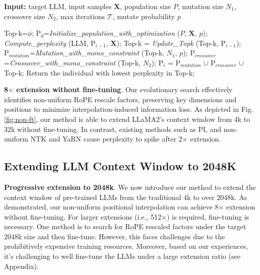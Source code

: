 \begin{algorithm}[t]
	\small
	\caption{The search algorithm}
	\textbf{Input:} target LLM, input samples $\mathbf{X}$,   population size $P$, mutation size $N_1$, crossover size $N_2$, max iterations $\mathcal{T}$, mutate probability $p$\\

	\begin{algorithmic}[1]
		\label{alg:search}
		\STATE Top-k=$\phi$;	
		\STATE $\text{P}_0$=\textit{Initialize\_population\_with\_optimization} ($P$, $\mathbf{X}$, $p$); 
		\STATE \textit{Compute\_perplexity} (LLM, $\text{P}_{i-1}$, $\mathbf{X}$);
		\STATE  Top-k = \textit{Update\_Topk} (Top-k, $\text{P}_{i-1}$);
		\STATE$\text{P}_{mutation}$=\textit{Mutation\_with\_mono\_constraint} (Top-k, $N_1$, $p$); 
		\STATE $\text{P}_{crossover}$=\textit{Crossover\_with\_mono\_constraint} (Top-k, $N_2$);
		\STATE $\text{P}_i$ = $\text{P}_{mutation}$ $\cup$ $\text{P}_{crossover}$ $\cup$ Top-k;
		\ENDFOR
		\STATE Return the individual with lowest perplexity in Top-k;
	\end{algorithmic}
\end{algorithm}

\textbf{8$\times$ extension without fine-tuning}. Our evolutionary search  effectively identifies non-uniform RoPE rescale factors, preserving key dimensions and positions to minimize interpolation-induced information loss. As depicted in Fig.\ref{fig:non-ft}, our method is able to extend LLaMA2's context window from 4k to 32k without fine-tuning. In contrast, existing methods such as PI, and non-uniform NTK and YaRN cause perplexity to spike after 2$\times$ extension.

\subsection{Extending LLM Context Window to 2048K}
\label{sec:extendto2048k}

\textbf{Progressive extension to 2048k}. We now introduce our method  to extend the context window of pre-trained LLMs from the traditional 4k to over 2048k. As demonstrated, our non-uniform positional interpolation can achieve 8$\times$ extension without fine-tuning. For larger extensions (i.e., 512$\times$) is required, fine-tuning is necessary. One method is to search for RoPE rescaled factors under the target 2048k size and then fine-tune. However, this faces challenges due to the prohibitively expensive training resources. Moreover,  based on our experiences, it's challenging to well fine-tune the LLMs under a  large extension ratio (see Appendix). 

